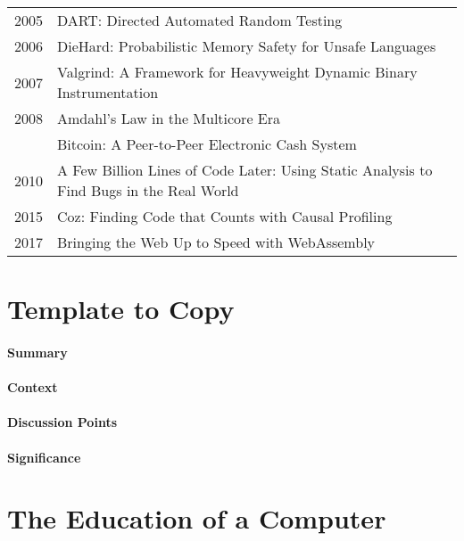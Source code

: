 {\begin{tabular}{r |@{\foo} l}
2005 & DART: Directed Automated Random Testing \cite{godefroid2005dart} \\
2006 & DieHard: Probabilistic Memory Safety for Unsafe Languages \cite{berger2006diehard} \\
2007 & Valgrind: A Framework for Heavyweight Dynamic Binary Instrumentation \cite{nethercote2007valgrind} \\
2008 & Amdahl’s Law in the Multicore Era \cite{hill2008amdahl} \\
     & Bitcoin: A Peer-to-Peer Electronic Cash System \cite{nakamoto2008bitcoin} \\
2010 & A Few Billion Lines of Code Later: Using Static Analysis to Find Bugs in the Real World \cite{bessey2010few} \\
2015 & Coz: Finding Code that Counts with Causal Profiling \cite{curtsinger2015c} \\
2017 & Bringing the Web Up to Speed with WebAssembly \cite{haas2017bringing} \\

\end{tabular}
}

\newpage

\section {Template to Copy}

\paragraph{\textbf{Summary}}
\paragraph{\textbf{Context}}
\paragraph{\textbf{Discussion Points}}
\paragraph{\textbf{Significance}}

\section {The Education of a Computer \cite{hopper1952education}}

